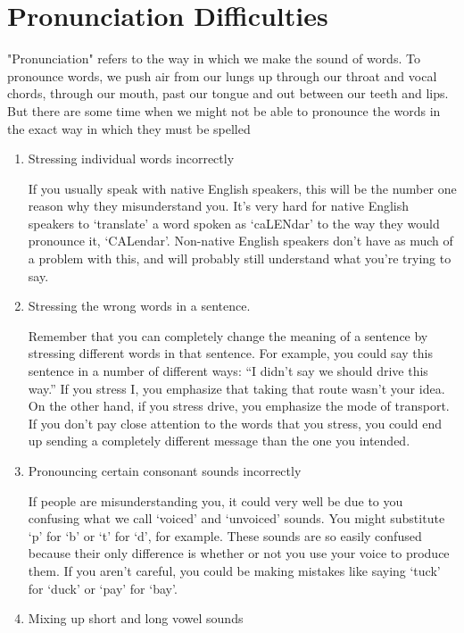 \section{Pronunciation Difficulties}

"Pronunciation" refers to the way in which we make the sound of words.
To pronounce words, we push air from our lungs up through our throat and vocal chords, through our mouth, past our tongue and out between our teeth and lips.
But there are some time when we might not be able to pronounce the words in the exact way in which they must be spelled

\begin{enumerate}
	\item  Stressing individual words incorrectly

If you usually speak with native English speakers, this will be the number one reason why they misunderstand you. It’s very hard for native English speakers to ‘translate’ a word spoken as ‘caLENdar’ to the way they would pronounce it, ‘CALendar’.  Non-native English speakers don’t have as much of a problem with this, and will probably still understand what you’re trying to say.

	\item Stressing the wrong words in a sentence.

		Remember that you can completely change the meaning of a sentence by stressing different words in that sentence. For example, you could say this sentence in a number of different ways:
		“I didn’t say we should drive this way.”
		If you stress I, you emphasize that taking that route wasn’t your idea. On the other hand, if you stress drive, you emphasize the mode of transport.
		If you don’t pay close attention to the words that you stress, you could end up sending a completely different message than the one you intended.


	\item Pronouncing certain consonant sounds incorrectly

If people are misunderstanding you, it could very well be due to you confusing what we call ‘voiced’ and ‘unvoiced’ sounds. You might substitute ‘p’ for ‘b’ or ‘t’ for ‘d’, for example. These sounds are so easily confused because their only difference is whether or not you use your voice to produce them. If you aren’t careful, you could be making mistakes like saying ‘tuck’ for ‘duck’ or ‘pay’ for ‘bay’.

	\item  Mixing up short and long vowel sounds


\end{enumerate}
